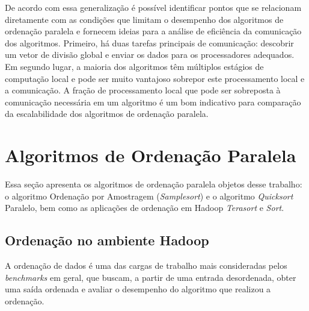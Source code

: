 De acordo com essa generalização  é possível identificar pontos que se relacionam diretamente com as condições que limitam o desempenho dos algoritmos de ordenação paralela e fornecem ideias para a análise de eficiência da comunicação dos algoritmos.
Primeiro, há duas tarefas principais de comunicação: descobrir um vetor de divisão global e enviar os dados para os processadores adequados. 
Em segundo lugar, a maioria dos algoritmos têm múltiplos estágios de computação local e pode ser muito vantajoso sobrepor este processamento local e a comunicação. 
A fração de  processamento local que pode ser sobreposta à comunicação necessária em um algoritmo  é um bom indicativo para comparação da escalabilidade dos algoritmos de ordenação paralela.


\section{Algoritmos de Ordenação Paralela}

Essa seção apresenta os algoritmos de ordenação paralela objetos desse trabalho: o algoritmo Ordenação por Amostragem  (\textit{Samplesort}) e o algoritmo \textit{Quicksort} Paralelo, bem como as aplicações de ordenação em Hadoop \textit{Terasort} e \textit{Sort}.  


\subsection{Ordenação no ambiente Hadoop}
\label{sec:benchmarks}
A ordenação de dados é uma das cargas de trabalho mais consideradas pelos \textit{benchmarks} em geral, que buscam, a partir de uma entrada desordenada, obter uma saída ordenada e avaliar o desempenho do algoritmo que realizou a ordenação.


